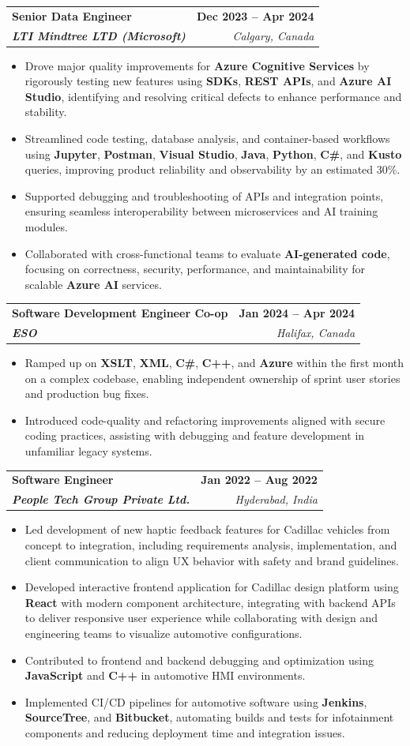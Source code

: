 \documentclass[letterpaper,11pt]{article}
\makeatletter
\newcommand{\resumeItem}[1]{
  \item\small{
    {#1 \vspace{-2pt}}
  }
}
\newcommand{\resumeSubheading}[4]{
  \vspace{-2pt}\item
    \begin{tabular*}{1.0\textwidth}[t]{l@{\extracolsep{\fill}}r}
      \textbf{#1} & \textbf{\small #2} \\
      \textit{\small#3} & \textit{\small #4} \\
    \end{tabular*}\vspace{-7pt}
}
\newcommand{\resumeItemListStart}{\begin{itemize}}
\newcommand{\resumeItemListEnd}{\end{itemize}\vspace{-5pt}}
\makeatother
\begin{document}
    \resumeSubheading
      {\textbf{Senior Data Engineer}}{\textbf{Dec 2023 -- Apr 2024}}
      {\textbf{LTI Mindtree LTD (Microsoft)}}{Calgary, Canada}
      \resumeItemListStart
        \resumeItem{Drove major quality improvements for \textbf{Azure Cognitive Services} by rigorously testing new features using \textbf{SDKs}, \textbf{REST APIs}, and \textbf{Azure AI Studio}, identifying and resolving critical defects to enhance performance and stability.}
        \resumeItem{Streamlined code testing, database analysis, and container-based workflows using \textbf{Jupyter}, \textbf{Postman}, \textbf{Visual Studio}, \textbf{Java}, \textbf{Python}, \textbf{C\#}, and \textbf{Kusto} queries, improving product reliability and observability by an estimated 30\%.}
        \resumeItem{Supported debugging and troubleshooting of APIs and integration points, ensuring seamless interoperability between microservices and AI training modules.}
        \resumeItem{Collaborated with cross-functional teams to evaluate \textbf{AI-generated code}, focusing on correctness, security, performance, and maintainability for scalable \textbf{Azure AI} services.}
      \resumeItemListEnd
    
    \resumeSubheading
      {\textbf{Software Development Engineer Co-op}}{\textbf{Jan 2024 -- Apr 2024}}
      {\textbf{ESO}}{Halifax, Canada}
      \resumeItemListStart
        \resumeItem{Ramped up on \textbf{XSLT}, \textbf{XML}, \textbf{C\#}, \textbf{C++}, and \textbf{Azure} within the first month on a complex codebase, enabling independent ownership of sprint user stories and production bug fixes.}
        \resumeItem{Introduced code-quality and refactoring improvements aligned with secure coding practices, assisting with debugging and feature development in unfamiliar legacy systems.}
      \resumeItemListEnd

    \resumeSubheading
      {\textbf{Software Engineer}}{\textbf{Jan 2022 -- Aug 2022}}
      {\textbf{People Tech Group Private Ltd.}}{Hyderabad, India}
      \resumeItemListStart
        \resumeItem{Led development of new haptic feedback features for Cadillac vehicles from concept to integration, including requirements analysis, implementation, and client communication to align UX behavior with safety and brand guidelines.}
        \resumeItem{Developed interactive frontend application for Cadillac design platform using \textbf{React} with modern component architecture, integrating with backend APIs to deliver responsive user experience while collaborating with design and engineering teams to visualize automotive configurations.}
        \resumeItem{Contributed to frontend and backend debugging and optimization using \textbf{JavaScript} and \textbf{C++} in automotive HMI environments.}
        \resumeItem{Implemented CI/CD pipelines for automotive software using \textbf{Jenkins}, \textbf{SourceTree}, and \textbf{Bitbucket}, automating builds and tests for infotainment components and reducing deployment time and integration issues.}
      \resumeItemListEnd
\end{document}
